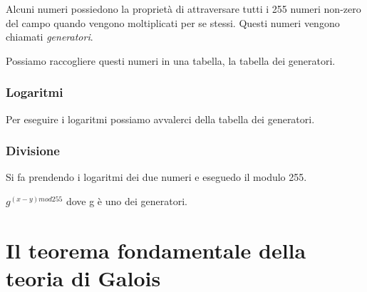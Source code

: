 \textsf{\small Alcuni numeri possiedono la proprietà di attraversare tutti i 255 numeri non-zero del campo quando vengono moltiplicati per se stessi. Questi numeri vengono chiamati \emph{generatori}.} %

\textsf{\small Possiamo raccogliere questi numeri in una tabella, la tabella dei generatori.}


\subsubsection{Logaritmi}

 

\textsf{\small Per eseguire i logaritmi possiamo avvalerci della tabella dei generatori.} %


\subsubsection{Divisione}

 

\textsf{\small Si fa prendendo i logaritmi dei due numeri e eseguedo il modulo 255.}

\textsf{\small $g^{(x - y) mod 255}$ dove g è uno dei generatori. }





\section{Il teorema fondamentale della teoria di Galois} %

   

